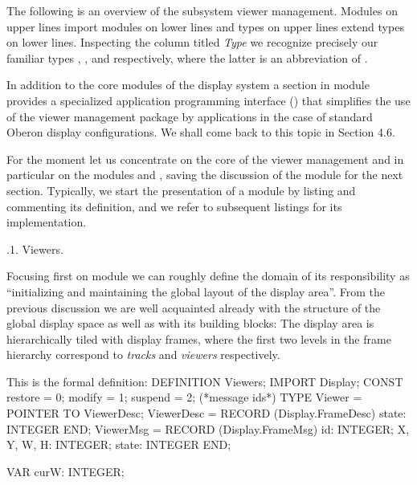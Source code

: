 The following is an overview of the subsystem viewer
management. Modules on upper lines import modules on lower lines and
types on upper lines extend types on lower lines.
\medskip
{}
\medskip
Inspecting the column titled \emph{Type} we recognize precisely our familiar types , , and  respectively, where the latter is an abbreviation of .

In addition to the core modules of the display system a section in module  provides a specialized application programming interface () that simplifies the use of the viewer management package by applications in the case of standard Oberon display configurations. We shall come back to this topic in Section 4.6.

For the moment let us concentrate on the core of the viewer management and in particular on the modules  and , saving the discussion of the module  for the next section. Typically, we start the presentation of a module by listing and commenting its definition, and we refer to subsequent listings for its implementation.

.1. Viewers.


Focusing first on module  we can roughly define the domain of
its responsibility as ``initializing and maintaining the global layout
of the display area''. From the previous discussion we are well
acquainted already with the structure of the global display space as
well as with its building blocks: The display area is hierarchically
tiled with display frames, where the first two levels in the frame
hierarchy correspond to \emph{tracks} and \emph{viewers} respectively.

This is the formal definition:
\begintt
DEFINITION Viewers;
  IMPORT Display;
  CONST restore = 0; modify = 1; suspend = 2; (*message ids*)
  TYPE Viewer = POINTER TO ViewerDesc;
       ViewerDesc = RECORD (Display.FrameDesc)
         state: INTEGER
       END;
       ViewerMsg = RECORD (Display.FrameMsg)
         id: INTEGER;
         X, Y, W, H: INTEGER;
         state: INTEGER
       END;

  VAR curW: INTEGER;
       
